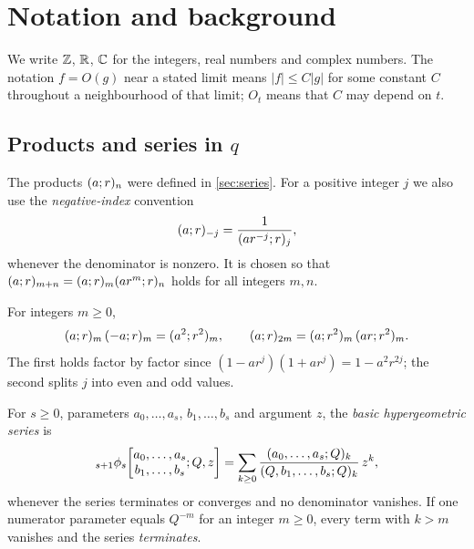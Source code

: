 \section{Notation and background}\label{sec:background}

We write $\mathbb{Z}$, $\mathbb{R}$, $\mathbb{C}$ for the integers, real numbers and complex numbers.
The notation $f=O(g)$ near a stated limit means $|f|\le C|g|$ for some
constant $C$ throughout a neighbourhood of that limit; $O_t$ means that $C$
may depend on $t$.

\subsection{Products and series in \texorpdfstring{$q$}{q}}
The products $(a;r)_{n}$ were defined in \cref{sec:series}. For a positive
integer $j$ we also use the \emph{negative-index} convention
\begin{equation}\label{eq:negindex}
(a;r)_{-j}=\frac{1}{(ar^{-j};r)_{j}},
\end{equation}
whenever the denominator is nonzero. It is chosen so that
$(a;r)_{m+n}=(a;r)_{m}(ar^m;r)_{n}$ holds for all integers
$m,n$.

\begin{fact}\label{fact:evenodd}
For integers $m\ge0$,
\[
(a;r)_{m}\,(-a;r)_{m}=(a^2;r^2)_{m},\qquad
(a;r)_{2m}=(a;r^2)_{m}\,(ar;r^2)_{m}.
\]
The first holds factor by factor since $(1-ar^j)(1+ar^j)=1-a^2r^{2j}$; the
second splits $j$ into even and odd values.
\end{fact}

For $s\ge0$, parameters $a_0,\dots,a_s$, $b_1,\dots,b_s$ and argument $z$, the
\emph{basic hypergeometric series} is
\[
{}_{s+1}\phi_s\!\left[\begin{matrix}a_0,\dots,a_s\\ b_1,\dots,b_s\end{matrix};Q,z\right]
=\sum_{k\ge0}\frac{(a_0,\dots,a_s;Q)_{k}}{(Q,b_1,\dots,b_s;Q)_{k}}\,z^k,
\]
whenever the series terminates or converges and no denominator vanishes. If
one numerator parameter equals $Q^{-m}$ for an integer $m\ge0$, every term
with $k>m$ vanishes and the series \emph{terminates}.

